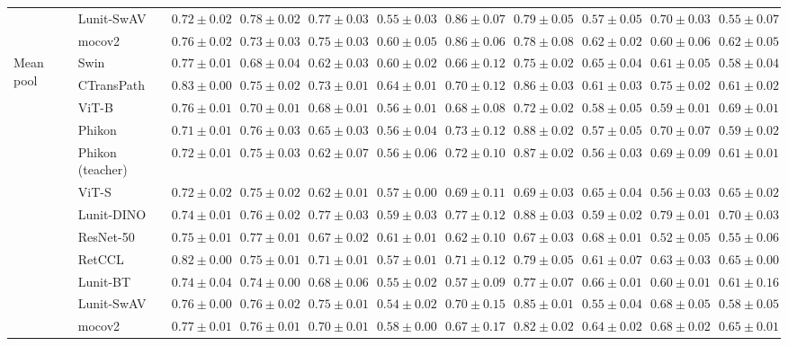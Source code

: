 \begin{tabular}{ll|cccc|c|cccc}
 & Lunit-SwAV & $0.72 \pm 0.02$ & $\mathbf{0.78 \pm 0.02}$ & $0.77 \pm 0.03$ & $0.55 \pm 0.03$ & $0.86 \pm 0.07$ & $0.79 \pm 0.05$ & $0.57 \pm 0.05$ & $0.70 \pm 0.03$ & $0.55 \pm 0.07$ \\
 & mocov2 & $0.76 \pm 0.02$ & $0.73 \pm 0.03$ & $0.75 \pm 0.03$ & $0.60 \pm 0.05$ & $0.86 \pm 0.06$ & $0.78 \pm 0.08$ & $0.62 \pm 0.02$ & $0.60 \pm 0.06$ & $0.62 \pm 0.05$ \\
\cline{1-11}
\multirow[t]{12}{*}{Mean pool} & Swin & $0.77 \pm 0.01$ & $0.68 \pm 0.04$ & $0.62 \pm 0.03$ & $0.60 \pm 0.02$ & $0.66 \pm 0.12$ & $0.75 \pm 0.02$ & $0.65 \pm 0.04$ & $0.61 \pm 0.05$ & $0.58 \pm 0.04$ \\
 & CTransPath & $\mathbf{0.83 \pm 0.00}$ & $0.75 \pm 0.02$ & $0.73 \pm 0.01$ & $\mathbf{0.64 \pm 0.01}$ & $0.70 \pm 0.12$ & $0.86 \pm 0.03$ & $0.61 \pm 0.03$ & $0.75 \pm 0.02$ & $0.61 \pm 0.02$ \\
 & ViT-B & $0.76 \pm 0.01$ & $0.70 \pm 0.01$ & $0.68 \pm 0.01$ & $0.56 \pm 0.01$ & $0.68 \pm 0.08$ & $0.72 \pm 0.02$ & $0.58 \pm 0.05$ & $0.59 \pm 0.01$ & $0.69 \pm 0.01$ \\
 & Phikon & $0.71 \pm 0.01$ & $0.76 \pm 0.03$ & $0.65 \pm 0.03$ & $0.56 \pm 0.04$ & $0.73 \pm 0.12$ & $0.88 \pm 0.02$ & $0.57 \pm 0.05$ & $0.70 \pm 0.07$ & $0.59 \pm 0.02$ \\
 & Phikon (teacher) & $0.72 \pm 0.01$ & $0.75 \pm 0.03$ & $0.62 \pm 0.07$ & $0.56 \pm 0.06$ & $0.72 \pm 0.10$ & $0.87 \pm 0.02$ & $0.56 \pm 0.03$ & $0.69 \pm 0.09$ & $0.61 \pm 0.01$ \\
 & ViT-S & $0.72 \pm 0.02$ & $0.75 \pm 0.02$ & $0.62 \pm 0.01$ & $0.57 \pm 0.00$ & $0.69 \pm 0.11$ & $0.69 \pm 0.03$ & $0.65 \pm 0.04$ & $0.56 \pm 0.03$ & $0.65 \pm 0.02$ \\
 & Lunit-DINO & $0.74 \pm 0.01$ & $0.76 \pm 0.02$ & $\mathbf{0.77 \pm 0.03}$ & $0.59 \pm 0.03$ & $\mathbf{0.77 \pm 0.12}$ & $\mathbf{0.88 \pm 0.03}$ & $0.59 \pm 0.02$ & $\mathbf{0.79 \pm 0.01}$ & $\mathbf{0.70 \pm 0.03}$ \\
 & ResNet-50 & $0.75 \pm 0.01$ & $\mathbf{0.77 \pm 0.01}$ & $0.67 \pm 0.02$ & $0.61 \pm 0.01$ & $0.62 \pm 0.10$ & $0.67 \pm 0.03$ & $\mathbf{0.68 \pm 0.01}$ & $0.52 \pm 0.05$ & $0.55 \pm 0.06$ \\
 & RetCCL & $0.82 \pm 0.00$ & $0.75 \pm 0.01$ & $0.71 \pm 0.01$ & $0.57 \pm 0.01$ & $0.71 \pm 0.12$ & $0.79 \pm 0.05$ & $0.61 \pm 0.07$ & $0.63 \pm 0.03$ & $0.65 \pm 0.00$ \\
 & Lunit-BT & $0.74 \pm 0.04$ & $0.74 \pm 0.00$ & $0.68 \pm 0.06$ & $0.55 \pm 0.02$ & $0.57 \pm 0.09$ & $0.77 \pm 0.07$ & $0.66 \pm 0.01$ & $0.60 \pm 0.01$ & $0.61 \pm 0.16$ \\
 & Lunit-SwAV & $0.76 \pm 0.00$ & $0.76 \pm 0.02$ & $0.75 \pm 0.01$ & $0.54 \pm 0.02$ & $0.70 \pm 0.15$ & $0.85 \pm 0.01$ & $0.55 \pm 0.04$ & $0.68 \pm 0.05$ & $0.58 \pm 0.05$ \\
 & mocov2 & $0.77 \pm 0.01$ & $0.76 \pm 0.01$ & $0.70 \pm 0.01$ & $0.58 \pm 0.00$ & $0.67 \pm 0.17$ & $0.82 \pm 0.02$ & $0.64 \pm 0.02$ & $0.68 \pm 0.02$ & $0.65 \pm 0.01$ \\
\cline{1-11}
\bottomrule
\end{tabular}
